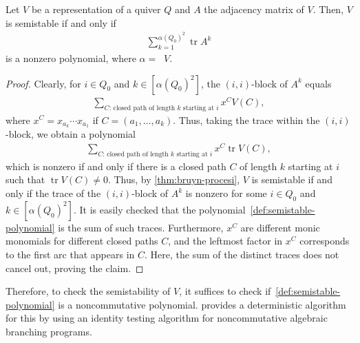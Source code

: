 \documentclass[a4paper,11pt]{article}
\numberwithin{equation}{section}
\DeclareMathOperator{\tr}{tr}
\DeclareMathOperator{\dimv}{\underline{dim}}
\begin{document}
\begin{lemma}
    Let $V$ be a representation of a quiver $Q$ and $A$ the adjacency matrix of $V$.
    Then, $V$ is semistable if and only if
    \begin{align}\label{def:semistable-polynomial}
        \sum_{k=1}^{{\alpha(Q_0)}^2} \tr A^k
    \end{align}
    is a nonzero polynomial, where $\alpha = \dimv V$.
\end{lemma}
\begin{proof}
    Clearly, for $i \in Q_0$ and $k \in [{\alpha(Q_0)}^2]$, the $(i,i)$-block of $A^k$ equals
    \begin{align}
        \sum_{\text{$C$: closed path of length $k$ starting at $i$}} x^C V(C),
    \end{align}
    where $x^C = x_{a_k} \dotsb x_{a_1}$ if $C = (a_1, \dots, a_k)$.
    Thus, taking the trace within the $(i,i)$-block, we obtain a polynomial
    \begin{align}\label{eq:trace-poly}
        \sum_{\text{$C$: closed path of length $k$ starting at $i$}} x^C \tr V(C),
    \end{align}
    which is nonzero if and only if there is a closed path $C$ of length $k$ starting at $i$ such that $\tr V(C) \neq 0$.
    Thus, by \cref{thm:bruyn-procesi}, $V$ is semistable if and only if the trace of the $(i, i)$-block of $A^k$ is nonzero for some $i \in Q_0$ and $k \in [{\alpha(Q_0)}^2]$.
    It is easily checked that the polynomial~\eqref{def:semistable-polynomial} is the sum of such traces.
    Furthermore, $x^C$ are different monic monomials for different closed paths $C$, and the leftmost factor in $x^C$ corresponds to the first arc that appears in $C$.
    Here, the sum of the distinct traces does not cancel out, proving the claim.
\end{proof}

Therefore, to check the semistability of $V$, it suffices to check if~\eqref{def:semistable-polynomial} is a noncommutative polynomial.
 provides a deterministic algorithm for this by using an identity testing algorithm for noncommutative algebraic branching programs.
\end{document}
